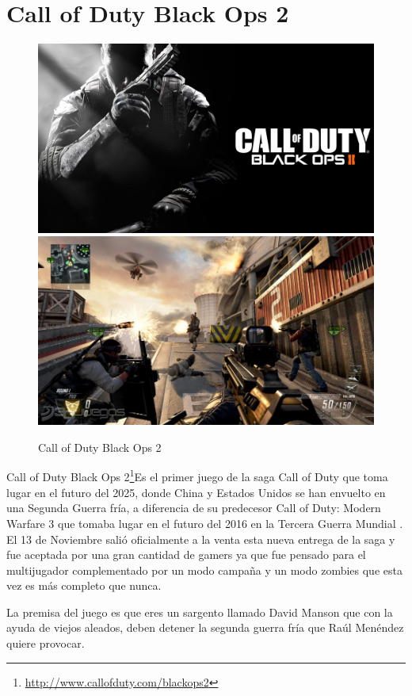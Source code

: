 \section{Call of Duty Black Ops 2}

\begin{figure}[htbp]
\begin{center}
\includegraphics[width=.60\textwidth]{./imagenes/black.jpg}
\includegraphics[width=.60\textwidth]{./imagenes/black2.jpg}
\caption{Call of Duty Black Ops 2}
\label{Call of Duty Black Ops 2}
\end{center}
\end{figure}
Call of Duty Black Ops 2\footnote{\url{http://www.callofduty.com/blackops2}}Es el primer juego de la saga Call of Duty que toma lugar en el futuro del 2025, donde China y Estados Unidos se han envuelto en una Segunda Guerra fría, a diferencia de su predecesor Call of Duty: Modern Warfare 3 que tomaba lugar en el futuro del 2016 en la Tercera Guerra Mundial . El 13 de Noviembre salió oficialmente a la venta esta nueva entrega de la saga y fue aceptada por una gran cantidad de gamers ya que fue pensado para el multijugador complementado por un modo campaña y un modo zombies que esta vez es más completo que nunca.

La premisa del juego es que eres un sargento llamado David Manson que con la ayuda de viejos aleados, deben detener la segunda guerra fría que Raúl Menéndez quiere provocar.

